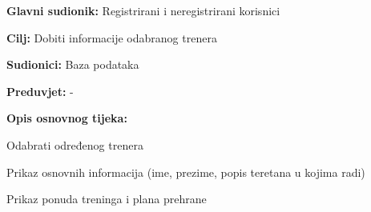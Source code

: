 				
				\noindent {}
				\begin{packed_item}
					
					\item \textbf{Glavni sudionik: } Registrirani i neregistrirani korisnici
					\item  \textbf{Cilj:} Dobiti informacije odabranog trenera
					\item  \textbf{Sudionici:} Baza podataka
					\item  \textbf{Preduvjet:} -
					\item  \textbf{Opis osnovnog tijeka:}
					
					\item[] \begin{packed_enum}
						
						\item Odabrati određenog trenera
						\item Prikaz osnovnih informacija (ime, prezime, popis teretana u kojima radi)
						\item Prikaz ponuda treninga i plana prehrane
					\end{packed_enum}
					
				\end{packed_item}
				
